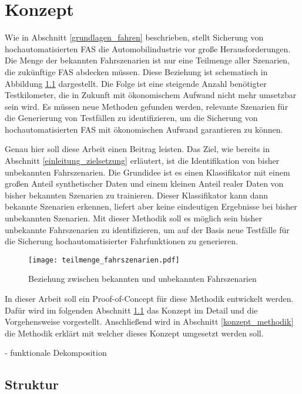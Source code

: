 
\chapter{Konzept}
\label{konzept}

Wie in Abschnitt \ref{grundlagen_fahren} beschrieben, stellt Sicherung von hochautomatisierten \ac{FAS} die Automobilindustrie vor große Herausforderungen. Die Menge der bekannten Fahrszenarien ist nur eine Teilmenge aller Szenarien, die zukünftige \ac{FAS} abdecken müssen. Diese Beziehung ist schematisch in Abbildung \ref{fig_teilmenge_fahrszenarien} dargestellt. Die Folge ist eine steigende Anzahl benötigter Testkilometer, die in Zukunft mit ökonomischem Aufwand nicht mehr umsetzbar sein wird. Es müssen neue Methoden gefunden werden, relevante Szenarien für die Generierung von Testfällen zu identifizieren, um die Sicherung von hochautomatisierten \ac{FAS} mit ökonomischen Aufwand garantieren zu können.

Genau hier soll diese Arbeit einen Beitrag leisten. Das Ziel, wie bereits in Abschnitt \ref{einleitung_zielsetzung} erläutert, ist die Identifikation von bisher unbekannten Fahrszenarien. Die Grundidee ist es einen Klassifikator mit einem großen Anteil synthetischer Daten und einem kleinen Anteil realer Daten von bisher bekannten Szenarien zu trainieren. Dieser Klassifikator kann dann bekannte Szenarien erkennen, liefert aber keine eindeutigen Ergebnisse bei bisher unbekannten Szenarien. Mit dieser Methodik soll es möglich sein bisher unbekannte Fahrszenarien zu identifizieren, um auf der Basis neue Testfälle für die Sicherung hochautomatisierter Fahrfunktionen zu generieren.

\begin{figure}[h]
\centering
\texttt{[image: teilmenge\_fahrszenarien.pdf]}
\caption{Beziehung zwischen bekannten und unbekannten Fahrszenarien}
\label{fig_teilmenge_fahrszenarien}
\end{figure}

In dieser Arbeit soll ein Proof-of-Concept für diese Methodik entwickelt werden. Dafür wird im folgenden Abschnitt \ref{konzept_struktur} das Konzept im Detail und die Vorgehensweise vorgestellt. Anschließend wird in Abschnitt \ref{konzept_methodik} die Methodik erklärt mit welcher dieses Konzept umgesetzt werden soll.

- funktionale Dekomposition

\section{Struktur}
\label{konzept_struktur}

